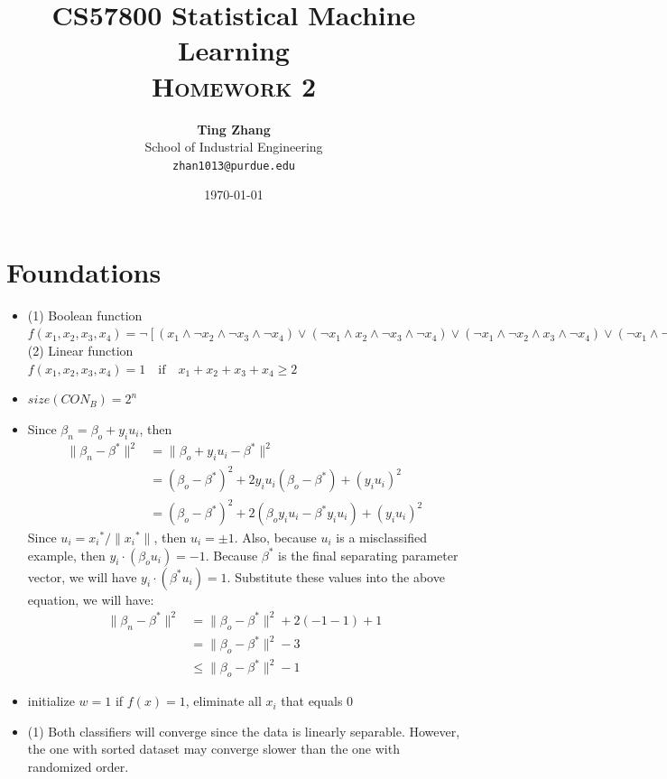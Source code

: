 \documentclass[11pt]{article}
\title{
\textbf{CS57800 Statistical Machine Learning} \\ \textsc{Homework 2} \\
\normalsize\vspace{0.1in}
}
\author{
	\textbf{Ting Zhang} \\
	School of Industrial Engineering\\
	\texttt{zhan1013@purdue.edu}
}
\date{\today}
\begin{document}
\maketitle

\section{Foundations}
\begin{itemize}
\item[1.]
(1) Boolean function \\
\(f(x_1,x_2,x_3,x_4)=\neg[(x_1\wedge \neg x_2\wedge \neg x_3\wedge\neg x_4)\vee
                     (\neg x_1\wedge  x_2\wedge \neg x_3\wedge\neg x_4)\vee
										 (\neg x_1\wedge \neg x_2\wedge  x_3\wedge\neg x_4)\vee
										 (\neg x_1\wedge \neg x_2\wedge \neg x_3\wedge x_4)\vee
										 (\neg x_1\wedge \neg x_2\wedge \neg x_3\wedge \neg x_4)] \) \\
(2) Linear function\\
\(f(x_1,x_2,x_3,x_4)=1 \quad \mathrm{if} \quad x_1+x_2+x_3+x_4 \geq 2\)
\item[2.]
\(size(CON_B)=2^n \)
\item[3.]
Since \(\beta_n = \beta_o+y_i u_i \), then
\begin{align*}
\|\beta_n-\beta^*\|^2 &=\|\beta_o+y_i u_i-\beta^*\|^2 \\
                      &=(\beta_o-\beta^*)^2+2y_i u_i(\beta_o-\beta^*)+(y_i u_i)^2 \\
											&=(\beta_o-\beta^*)^2+2(\beta_o y_i u_i-\beta^*y_i u_i)+(y_i u_i)^2
\end{align*}
Since \(u_i={x_i}^*/\|{x_i}^*\|\), then \(u_i=\pm 1\). Also, because \(u_i\) is a misclassified example, then \(y_i \cdot (\beta_o u_i)=-1\). Because \(\beta^*\) is the final separating parameter vector, we will have \(y_i \cdot (\beta^* u_i)=1\). Substitute these values into the above equation, we will have:
\begin{align*}
\|\beta_n-\beta^*\|^2 &=\|\beta_o-\beta^*\|^2+2(-1-1)+1 \\
                      &=\|\beta_o-\beta^*\|^2-3 \\
											& \leq \|\beta_o-\beta^*\|^2-1
\end{align*}
\item[4.]
initialize \(w=1\)
if \(f(x)=1\), eliminate all \(x_i\) that equals 0
\item[5.]
(1) Both classifiers will converge since the data is linearly separable. However, the one with sorted dataset may converge slower than the one with randomized order.

\end{itemize}
\end{document}
